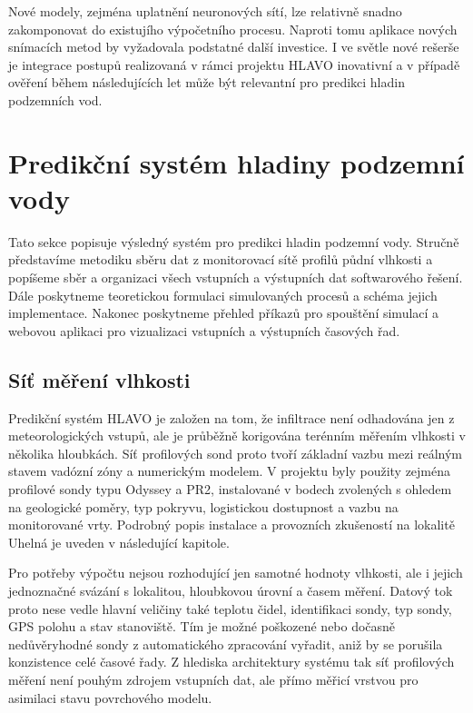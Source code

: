 \documentclass[11pt,a4paper]{article}
\begin{document}
\begin{onehalfspacing}
Nové modely, zejména uplatnění neuronových sítí, lze relativně snadno zakomponovat do existujího výpočetního procesu. Naproti tomu aplikace nových snímacích metod by vyžadovala podstatné další investice. I ve světle nové rešerše je integrace postupů realizovaná v rámci projektu HLAVO inovativní a 
v případě ověření během následujících let může být relevantní pro predikci hladin podzemních vod.  

\section{Predikční systém hladiny podzemní vody}
Tato sekce popisuje výsledný systém pro predikci hladin podzemní vody. 
Stručně představíme metodiku sběru dat z monitorovací sítě profilů půdní vlhkosti a popíšeme sběr a organizaci všech vstupních a výstupních dat softwarového řešení. Dále poskytneme teoretickou formulaci simulovaných procesů a schéma jejich implementace. Nakonec poskytneme přehled příkazů pro spouštění simulací a webovou aplikaci pro vizualizaci vstupních a výstupních časových řad.

\subsection{Síť měření vlhkosti}
Predikční systém HLAVO je založen na tom, že infiltrace není odhadována jen z
meteorologických vstupů, ale je průběžně korigována terénním měřením vlhkosti
v několika hloubkách. Síť profilových sond proto tvoří základní vazbu mezi
reálným stavem vadózní zóny a numerickým modelem. V projektu byly použity
zejména profilové sondy typu Odyssey a PR2, instalované v bodech zvolených s
ohledem na geologické poměry, typ pokryvu, logistickou dostupnost a vazbu na
monitorované vrty. Podrobný popis instalace a provozních zkušeností na
lokalitě Uhelná je uveden v následující kapitole.

Pro potřeby výpočtu nejsou rozhodující jen samotné hodnoty vlhkosti, ale i
jejich jednoznačné svázání s lokalitou, hloubkovou úrovní a časem měření.
Datový tok proto nese vedle hlavní veličiny také teplotu čidel, identifikaci
sondy, typ sondy, GPS polohu a stav stanoviště. Tím je možné poškozené nebo
dočasně nedůvěryhodné sondy z automatického zpracování vyřadit, aniž by se
porušila konzistence celé časové řady. Z hlediska architektury systému tak síť
profilových měření není pouhým zdrojem vstupních dat, ale přímo měřicí vrstvou
pro asimilaci stavu povrchového modelu.


\end{onehalfspacing}
\end{document}
